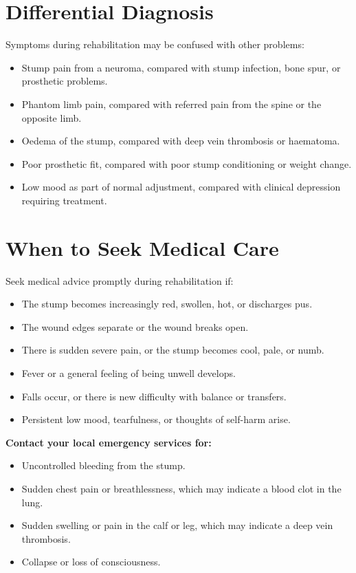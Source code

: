 \section*{Differential Diagnosis}
Symptoms during rehabilitation may be confused with other problems:

\begin{itemize}
    \item Stump pain from a neuroma, compared with stump infection, bone spur, or prosthetic problems.
    \item Phantom limb pain, compared with referred pain from the spine or the opposite limb.
    \item Oedema of the stump, compared with deep vein thrombosis or haematoma.
    \item Poor prosthetic fit, compared with poor stump conditioning or weight change.
    \item Low mood as part of normal adjustment, compared with clinical depression requiring treatment.
\end{itemize}

\section*{When to Seek Medical Care}
Seek medical advice promptly during rehabilitation if:

\begin{itemize}
    \item The stump becomes increasingly red, swollen, hot, or discharges pus.
    \item The wound edges separate or the wound breaks open.
    \item There is sudden severe pain, or the stump becomes cool, pale, or numb.
    \item Fever or a general feeling of being unwell develops.
    \item Falls occur, or there is new difficulty with balance or transfers.
    \item Persistent low mood, tearfulness, or thoughts of self-harm arise.
\end{itemize}

\textbf{Contact your local emergency services for:}
\begin{itemize}
    \item Uncontrolled bleeding from the stump.
    \item Sudden chest pain or breathlessness, which may indicate a blood clot in the lung.
    \item Sudden swelling or pain in the calf or leg, which may indicate a deep vein thrombosis.
    \item Collapse or loss of consciousness.
\end{itemize}

